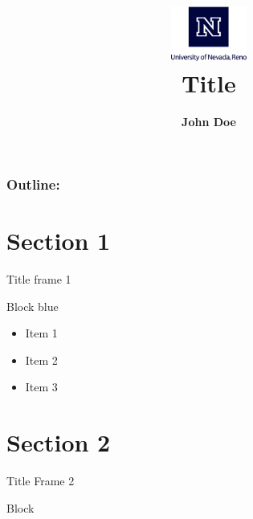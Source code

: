 \documentclass[xcolor=dvipsnames]{beamer}
\title[Title]{\includegraphics[height=1.8cm]{images/nevada-vertical-blue.eps}\\Title}
\author[John Doe]{ \textbf{John Doe}}
\institute{UNR}
\begin{document}
{
\begin{frame}
\vspace{6em}
  \titlepage
\end{frame}
}
\begin{frame}
\frametitle{\textbf{Outline:}}
\tableofcontents
\end{frame}

		
  
    \section{Section 1}  
     \begin{frame}{Title frame 1}
            \begin{block}{Block blue}
    		\begin{itemize}
    		\item Item 1
    		\item Item 2
    		\item Item 3
  			\end{itemize}
        \end{block}  
     \end{frame}
          
   \section{Section 2}  
     \begin{frame}{Title Frame 2}
        \begin{block}{Block}
            \lipsum[1]
        \end{block}
     \end{frame}
     
\end{document}
